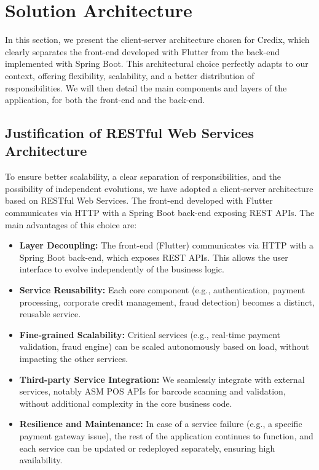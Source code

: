 \section{Solution Architecture}

In this section, we present the client-server architecture chosen for Credix, which clearly separates the front-end developed with Flutter from the back-end implemented with Spring Boot. This architectural choice perfectly adapts to our context, offering flexibility, scalability, and a better distribution of responsibilities. We will then detail the main components and layers of the application, for both the front-end and the back-end.

\subsection{Justification of RESTful Web Services Architecture}

To ensure better scalability, a clear separation of responsibilities, and the possibility of independent evolutions, we have adopted a client-server architecture based on RESTful Web Services. The front-end developed with Flutter communicates via HTTP with a Spring Boot back-end exposing REST APIs. The main advantages of this choice are:

\begin{itemize}
    \item \textbf{Layer Decoupling:} The front-end (Flutter) communicates via HTTP with a Spring Boot back-end, which exposes REST APIs. This allows the user interface to evolve independently of the business logic.
    \item \textbf{Service Reusability:} Each core component (e.g., authentication, payment processing, corporate credit management, fraud detection) becomes a distinct, reusable service.
    \item \textbf{Fine-grained Scalability:} Critical services (e.g., real-time payment validation, fraud engine) can be scaled autonomously based on load, without impacting the other services.
    \item \textbf{Third-party Service Integration:} We seamlessly integrate with external services, notably ASM POS APIs for barcode scanning and validation, without additional complexity in the core business code.
    \item \textbf{Resilience and Maintenance:} In case of a service failure (e.g., a specific payment gateway issue), the rest of the application continues to function, and each service can be updated or redeployed separately, ensuring high availability.
\end{itemize}

